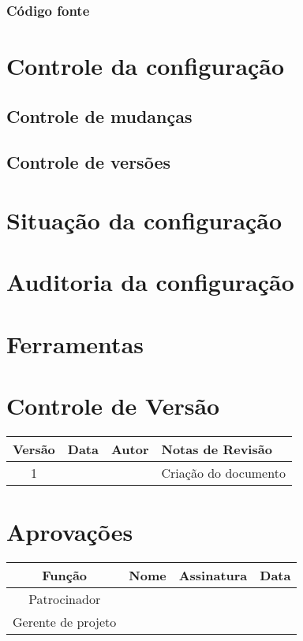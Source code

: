\subsubsection{Código fonte}

\section{Controle da configuração}

\subsection{Controle de mudanças}

\subsection{Controle de versões}

\section{Situação da configuração}

\section{Auditoria da configuração}

\section{Ferramentas}

\section{Controle de Versão}

\begin{table}[H]
	\begin{tabularx}{\textwidth}{| c | c | X | X |}
		\hline
		\textbf{Versão} & \textbf{Data} & \textbf{Autor}      & \textbf{Notas de Revisão} \\
		\hline
		1                &               & \projectManagerName & Criação do documento     \\
		\hline
	\end{tabularx}
	\centering
\end{table}

\section{Aprovações}

\begin{table}[H]
	\begin{tabularx}{\textwidth}{| c | c | X | c |}
		\hline
		\textbf{Função}  & \textbf{Nome}       & \textbf{Assinatura}      & \textbf{Data} \\
		\hline
		Patrocinador       & \projectSponsorName & \projectSponsorSignature &               \\
		\hline
		Gerente de projeto & \projectManagerName & \projectManagerSignature &               \\
		\hline
	\end{tabularx}
	\centering
\end{table}